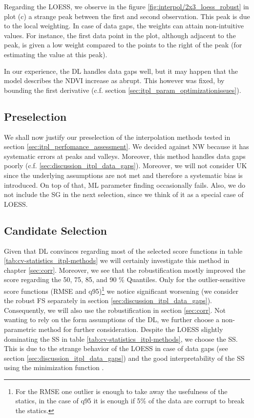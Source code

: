 {{        Regarding the LOESS, we observe in the figure \ref{fig:interpol/2x3_loess_robust} in plot (c) a strange peak between the first and second observation. This peak is due to the local weighting. In case of data gaps, the weights can attain non-intuitive values. For instance, the first data point in the plot, although adjacent to the peak, is given a low weight compared to the points to the right of the peak (for estimating the value at this peak).

        In our experience, the DL handles data gaps well, but it may happen that the model describes the NDVI increase as abrupt. This however was fixed, by bounding the first derivative (c.f. section \ref{sec:itpl_param_optimizationissues}).
    }

    \subsection{Preselection}{\label{sec:itpl_preselection}
        We shall now justify our preselection of the interpolation methods tested in section \ref{sec:itpl_perfomance_assessment}. 
        We decided against NW because it has systematic errors at peaks and valleys. Moreover, this method handles data gaps poorly (c.f. \ref{sec:discussion_itpl_data_gaps}). 
        Moreover, we will not consider UK since the underlying assumptions are not met and therefore a systematic bias is introduced. On top of that, ML parameter finding occasionally fails.
        Also, we do not include the SG in the next selection, since we think of it as a special case of LOESS.
    }

    \subsection{Candidate Selection}{
        Given that DL convinces regarding most of the selected score functions in table \ref{tab:cv-statistics_itpl-methods} we will certainly investigate this method in chapter \ref{sec:corr}. Moreover, we see that the robustification mostly improved the score regarding the 50, 75, 85, and 90 \% Quantiles. Only for the outlier-sensitive score functions (RMSE and q95)\footnote{For the RMSE one outlier is enough to take away the usefulness of the statics, in the case of q95 it is enough if 5\% of the data are corrupt to break the statics.} we notice significant worsening (we consider the robust FS separately in section \ref{sec:discussion_itpl_data_gaps}). Consequently, we will also use the robustification in section \ref{sec:corr}.
        Not wanting to rely on the form assumptions of the DL, we further choose a non-parametric method for further consideration. Despite the LOESS slightly dominating the SS in table \ref{tab:cv-statistics_itpl-methods}, we choose the SS. This is due to the strange behavior of the LOESS in case of data gaps (see section \ref{sec:discussion_itpl_data_gaps}) and the good interpretability of the SS using the minimization function .
    }


}

